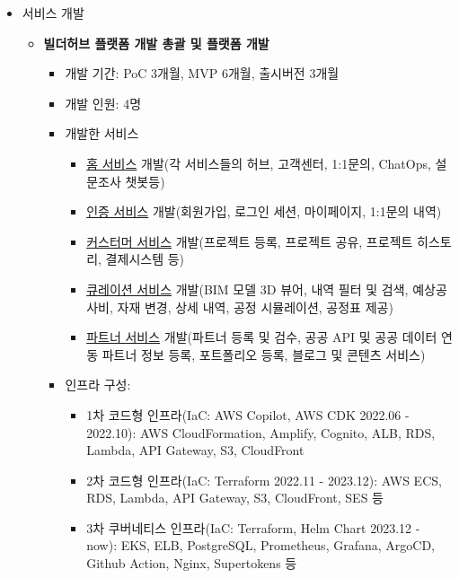 \begin{itemize}[label=]
	\item 서비스 개발
	      \begin{itemize}[label=]
		      \item \textbf{빌더허브 플랫폼 개발 총괄 및 플랫폼 개발}
		            \begin{itemize}[label=]
			            \item 개발 기간: PoC 3개월, MVP 6개월, 출시버전 3개월
			            \item 개발 인원: 4명
			            \item 개발한 서비스
			                  \begin{itemize}
				                  \item \href{https://builderhub.io}{홈 서비스} 개발(각 서비스들의 허브, 고객센터, 1:1문의, ChatOps, 설문조사 챗봇등)
				                  \item \href{https://auth.builderhub.io}{인증 서비스} 개발(회원가입, 로그인 세션, 마이페이지, 1:1문의 내역)
				                  \item \href{https://app.builderhub.io}{커스터머 서비스} 개발(프로젝트 등록, 프로젝트 공유, 프로젝트 히스토리, 결제시스템 등)
				                  \item \href{https://curation.builderhub.io/project/tester}{큐레이션 서비스} 개발(BIM 모델 3D 뷰어, 내역 필터 및 검색, 예상공사비, 자재 변경, 상세 내역, 공정 시뮬레이션, 공정표 제공)
				                  \item \href{https://partners.builderhub.io/}{파트너 서비스} 개발(파트너 등록 및 검수, 공공 API 및 공공 데이터 연동 파트너 정보 등록, 포트폴리오 등록, 블로그 및 콘텐츠 서비스)
			                  \end{itemize}
			            \item 인프라 구성:
			                  \begin{itemize}
				                  \item 1차 코드형 인프라(IaC: AWS Copilot, AWS CDK 2022.06 - 2022.10): AWS CloudFormation, Amplify, Cognito, ALB, RDS, Lambda, API Gateway, S3, CloudFront
				                  \item 2차 코드형 인프라(IaC: Terraform 2022.11 - 2023.12): AWS ECS, RDS, Lambda, API Gateway, S3, CloudFront, SES 등
				                  \item 3차 쿠버네티스 인프라(IaC: Terraform, Helm Chart 2023.12 - now): EKS, ELB, PostgreSQL, Prometheus, Grafana, ArgoCD, Github Action, Nginx, Supertokens 등

\end{itemize}
\end{itemize}
\end{itemize}
\end{itemize}

